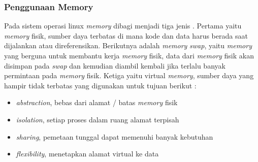 
\subsubsection{Penggunaan Memory}

Pada sistem operasi linux \textit{memory} dibagi menjadi tiga jenis \cite{manual:linux}. Pertama yaitu \textit{memory} fisik, sumber daya terbatas di mana kode dan data harus berada saat dijalankan atau direferensikan. Berikutnya adalah \textit{memory} \textit{swap}, yaitu  \textit{memory} yang berguna untuk membantu kerja \textit{memory} fisik, data dari \textit{memory} fisik akan disimpan pada \textit{swap} dan kemudian diambil kembali jika terlalu banyak permintaan pada \textit{memory} fisik. Ketiga yaitu virtual \textit{memory}, sumber daya yang hampir tidak terbatas yang digunakan untuk tujuan berikut \cite{book:os}:

\begin{itemize} [noitemsep, topsep=0pt]
    \item \textit{abstraction}, bebas dari alamat / batas \textit{memory} fisik 
    \item \textit{isolation}, setiap proses dalam ruang alamat terpisah 
    \item \textit{sharing}, pemetaan tunggal dapat memenuhi banyak kebutuhan 
    \item \textit{flexibility}, menetapkan alamat virtual ke data 
\end{itemize}


